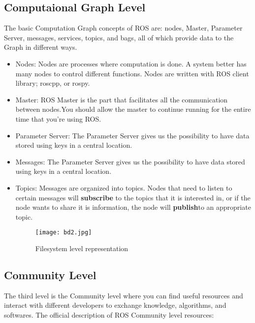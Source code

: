 \subsection{Computaional Graph Level}
The basic Computation Graph concepts of ROS are: nodes, Master, Parameter Server, messages, services, topics, and bags, all of which provide data to the Graph in different ways.
\begin{itemize}
	\item Nodes: Nodes are processes where computation is done. A system better has many nodes to control different functions. Nodes are written with ROS client library; roscpp, or rospy.
	\item Master: ROS Master is the part that facilitates all the communication between nodes.You should allow the master to continue running for the entire time that you’re using ROS.
	\item Parameter Server: The Parameter Server gives us the possibility to have data stored using keys in a central location.
	\item  Messages: The Parameter Server gives us the possibility to have data stored using keys in a central location.
	\item Topics: Messages are organized into topics. Nodes that need to listen to certain messages will \textbf{subscribe} to the topics that it is interested in, or if the node wants to share it is information, the node will \textbf{publish}to an appropriate topic.
	\begin{figure}[H]
		\centering
		\texttt{[image: bd2.jpg]}
        		\caption{Filesystem level representation}
	\end{figure}
\end{itemize}

\subsection{Community Level}
The third level is the Community level where you can find useful resources and interact with different developers to exchange knowledge, algorithms, and softwares.
The official description of ROS Community level resources:

